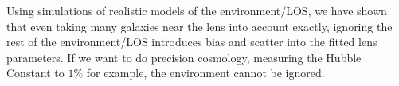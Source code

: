 Using simulations of realistic models of the environment/LOS, we have shown that even taking many galaxies near the lens into account exactly, ignoring the rest of the environment/LOS introduces bias and scatter into the fitted lens parameters. If we want to do precision cosmology, measuring the Hubble Constant to $1\%$ for example, the environment cannot be ignored.